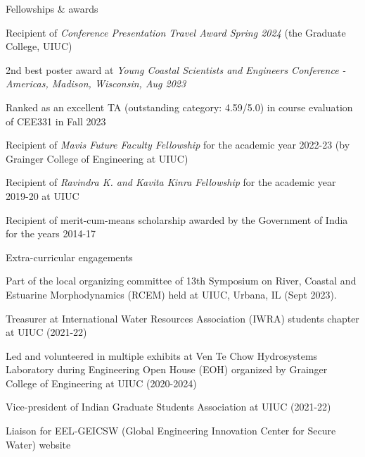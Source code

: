\documentclass{resume} %
\begin{document}
\begin{rSection}{Fellowships \& awards}
\item Recipient of \textit{Conference Presentation Travel Award Spring 2024} (the Graduate College, UIUC)
\item 2nd best poster award at \textit{Young Coastal Scientists and Engineers Conference - Americas, Madison, Wisconsin, Aug 2023}
\item Ranked as an excellent TA (outstanding category: 4.59/5.0) in course evaluation of CEE331 in Fall 2023
\item Recipient of \textit{Mavis Future Faculty Fellowship} for the academic year 2022-23 (by Grainger College of Engineering at UIUC)
\item Recipient of \textit{Ravindra K. and Kavita Kinra Fellowship} for the academic year 2019-20 at UIUC
\item Recipient of merit-cum-means scholarship awarded by the Government of India for the years 2014-17
\end{rSection}

\begin{rSection}{Extra-curricular engagements}
\item Part of the local organizing committee of 13th Symposium on River, Coastal and Estuarine Morphodynamics (RCEM) held at UIUC, Urbana, IL (Sept 2023). 
\item Treasurer at International Water Resources Association (IWRA) students chapter at UIUC (2021-22)
\item Led and volunteered in multiple exhibits at Ven Te Chow Hydrosystems Laboratory during Engineering Open House (EOH) organized by Grainger College of Engineering at UIUC (2020-2024) 
\item Vice-president of Indian Graduate Students Association at UIUC (2021-22)
\item Liaison for EEL-GEICSW (Global Engineering
Innovation Center for Secure Water) website 
\end{rSection}
\end{document}
